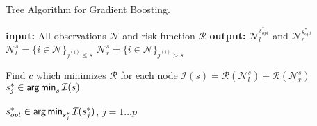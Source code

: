\begin{algorithm}[H]
  \begin{footnotesize}
  \begin{center}
  \caption{Tree Algorithm for Gradient Boosting.}
    \begin{algorithmic}[1]
      \State \textbf{input: } All observations $\mathcal{N}$ and risk function $\mathcal{R}$
      \State \textbf{output: } $\mathcal{N}_l^{s^*_{opt}}$ and $\mathcal{N}_r^{s^*_{opt}}$
         \State $\mathcal{N}_l^s = \{ i \in \mathcal{N}\}_{j^{(i)} \leq s}$
            \State $\mathcal{N}_r^s = \{i \in \mathcal{N}\}_{j^{(i)} > s}$ 
              
            \State Find $c$ which minimizes $\mathcal{R}$ for each node
            \State $\mathcal{I}(s) = \mathcal{R}(\mathcal{N}_l^s) + \mathcal{R}(\mathcal{N}_r^s)$
        \EndFor
        \State $s^*_{j} \in \mathop{\sf arg\,min}\nolimits_s \mathcal{I}(s)$
       
      \EndFor
      \State $s^*_{opt} \in \mathop{\sf arg\,min}\nolimits_{s^*_{j}} \mathcal{I}(s^*_{j})$, $j = 1 \dots p$
    \end{algorithmic}
    \end{center}
    \end{footnotesize}
\end{algorithm}
